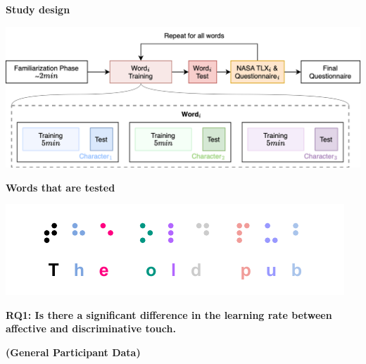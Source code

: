 

\textbf{Study design}

    \centering
    \includegraphics[width=0.75\linewidth]{src/pictures/StudyData/Study_design.drawio.png}

\textbf{Words that are tested}


    \centering
    \includegraphics[width=.75\linewidth]{src/pictures/braille_prestudy_characters.drawio.pdf}


 
\textbf{RQ1: Is there a significant difference in the learning rate between affective and discriminative touch.}

\textbf{(General Participant Data)}



